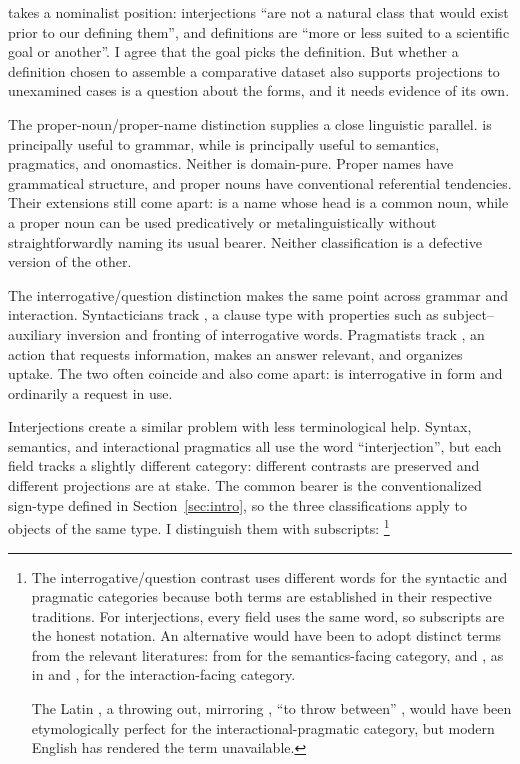\documentclass[12pt]{article}
\begin{document}
\textcite[3]{ponsonnet2025} takes a nominalist position: interjections
\enquote{are not a natural class that would exist prior to our defining
them}, and definitions are \enquote{more or less suited to a scientific goal
or another}. I agree that the goal picks the definition. But whether a
definition chosen to assemble a comparative dataset also supports projections
to unexamined cases is a question about the forms, and it needs evidence of
its own.

The proper-noun/proper-name distinction supplies a close linguistic
parallel.  is principally useful to grammar, while
 is principally useful to semantics, pragmatics, and
onomastics. Neither is domain-pure. Proper names have grammatical structure,
and proper nouns have conventional referential tendencies. Their extensions
still come apart:  is a name whose head is
a common noun, while a proper noun can be used predicatively or
metalinguistically without straightforwardly naming its usual bearer. Neither
classification is a defective version of the other.

The interrogative/question distinction makes the same point across grammar
and interaction. Syntacticians track , a clause type with
properties such as subject--auxiliary inversion and fronting of interrogative
words. Pragmatists track , an action that requests information,
makes an answer relevant, and organizes uptake. The two often coincide and
also come apart:  is interrogative in form and
ordinarily a request in use.

Interjections create a similar problem with less terminological help.
Syntax, semantics, and interactional pragmatics all use the
word \enquote{interjection}, but each field tracks a slightly different
category: different contrasts are preserved and different projections are
at stake. The common bearer is the conventionalized sign-type defined in
Section~\ref{sec:intro}, so the three classifications apply to objects of the
same type. I distinguish them with subscripts:%
\footnote{The interrogative/question contrast uses different words for
  the syntactic and pragmatic categories because both terms are established
  in their respective traditions. For interjections,
  every field uses the same word, so subscripts are the honest notation.
  An alternative would have been to adopt distinct terms from the
  relevant literatures:  from \textcite{potts2007}
  for the semantics-facing category, and , as in
  \textcite[870]{norrick2009} and \textcite[265]{dingemanse2024}, for the
  interaction-facing category.

  The Latin
  , a throwing out, mirroring ,
  \enquote{to throw between} \citep{libert2019},
  would have been etymologically perfect
  for the interactional-pragmatic category, but modern English has
  rendered the term unavailable.}
\end{document}
